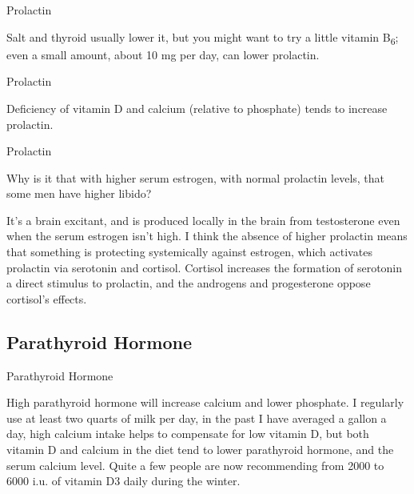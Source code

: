 \documentclass[11pt,oneside,openany,extrafontsizes]{memoir}
\begin{document}
\begin{standalonequote}{Prolactin}

    \begin{answer}
        Salt and thyroid usually lower it, but you might want to try a little vitamin B\textsubscript{6}; even a small amount, about 10 mg per day, can lower prolactin.
    \end{answer}
\end{standalonequote}

\begin{standalonequote}{Prolactin}

    \begin{answer}
       Deficiency of vitamin D and calcium (relative to phosphate) tends to increase prolactin.
    \end{answer}
\end{standalonequote}

\begin{qaexchange}{Prolactin}

    \begin{question}
        Why is it that with higher serum estrogen, with normal prolactin levels, that some men have higher libido?
    \end{question}

    \begin{answer}
      It's a brain excitant, and is produced locally in the brain from testosterone even when the serum estrogen isn't high. I think the absence of higher prolactin means that something is protecting systemically against estrogen, which activates prolactin via serotonin and cortisol. Cortisol increases the formation of serotonin a direct stimulus to prolactin, and the androgens and progesterone oppose cortisol's effects.
    \end{answer}
\end{qaexchange}

\subsection{Parathyroid Hormone}

\begin{standalonequote}{Parathyroid Hormone}

    \begin{answer}
        High parathyroid hormone will increase calcium and lower phosphate. I regularly use at least two quarts of milk per day, in the past I have averaged a gallon a day, high calcium intake helps to compensate for low vitamin D, but both vitamin D and calcium in the diet tend to lower parathyroid hormone, and the serum calcium level. Quite a few people are now recommending from 2000 to 6000 i.u. of vitamin D3 daily during the winter.
    \end{answer}
\end{standalonequote}
\end{document}
